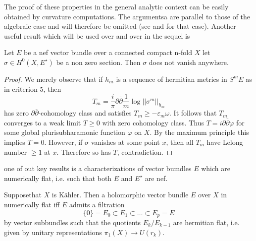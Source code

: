 The proof of these properties in the general analytic context can be easily obtained by curvature computations. The argumentsa are parallel to those of the algebraic case and will therefore be omitted (see \cite{chap5-keyHa66} and \cite{chap5-keyCP91} for that case). Another useful result which will be used over and over in the sequel is

\begin{secprop}\label{chap5-prop-1.7}
Let $E$ be a nef vector bundle over a connected compact n-fold $X$ let $\sigma \in H^{0}(X, E^{\star})$ be a non zero section. Then $\sigma$ does not vanish anywhere.
\end{secprop}

\begin{proof}
We merely observe that if $h_{m}$ is a sequence of hermitian metrics in $S^{m}E$ as in criterion 5, then
$$
T_{m}=\dfrac{i}{\pi} \partial\overline{\partial} \dfrac{1}{m}\log||\sigma^{m}||_{h_{m}}
$$
has zero $\partial\overline{\partial}$-cohomology class and satisfies $T_{m}\geq -\varepsilon_{m}\omega$. It follows that $T_{m}$ converges to a weak limit $T\geq 0$ with zero cohomology class. Thus $T= i\partial\overline{\partial}\varphi$ for some global plurisubharamonic function $\varphi$ on $X$. By the maximum principle this implies $T=0$. However, if $\sigma$ vanishes at some point $x$, then all $T_{m}$ have Lelong number $\geq 1$ at $x$. Therefore so has $T$, contradiction.
\end{proof}

one of out key results is a characterizations of vector bumdles $E$ which are numerically flat, i.e. such that both $E$ and $E^{\star}$ are nef.

\begin{secthm}\label{chap5-thm-1.8}
Suppose\pageoriginale that $X$ is K\"ahler. Then a holomorphic vector bundle $E$ over $X$ in numerically flat iff $E$ admits a filtration
$$
\{0 \} = E_{0}\subset E_{1}\subset \ldots \subset E_{p} = E
$$
by vector subbundles such that the quotients $E_{k}/E_{k-1}$ are hermitian flat, i.e. given by unitary representations $\pi_{1}(X) \rightarrow U(r_{k})$.
\end{secthm}

